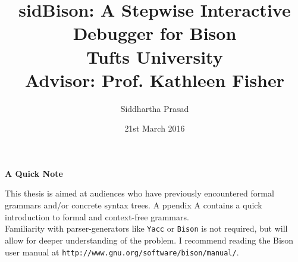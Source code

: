 \documentclass {report}
\title {
	{sidBison: A Stepwise Interactive Debugger for Bison\\[0.4in]}
	{ Tufts University\\[0.2in]}
	{\large Advisor: Prof. Kathleen Fisher\\}
	}
\author {Siddhartha Prasad}
\date{21st March 2016}
\begin{document}
\maketitle



\pagebreak
\tableofcontents
\pagebreak


\thispagestyle{plain}
\begin{center}
    \textbf{A Quick Note}
\end{center}

\noindent

This thesis is aimed at audiences who have previously encountered formal grammars and/or concrete syntax trees.
A ppendix A contains a quick introduction to formal and context-free grammars.\\

Familiarity with parser-generators like \verb|Yacc| or \verb|Bison| is not required, but will allow for deeper understanding of the problem. I recommend reading the Bison user manual at \verb|http://www.gnu.org/software/bison/manual/|.

\pagebreak















\end{document}
